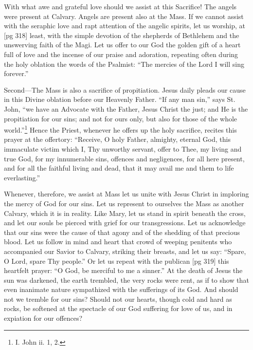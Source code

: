 With what awe and grateful love should we
assist at this Sacrifice! The angels were present
at Calvary. Angels are present also at the Mass.
If we cannot assist with the seraphic love and rapt
attention of the angelic spirits, let us worship, at
[pg 318]
least, with the simple devotion of the shepherds
of Bethlehem and the unswerving faith of the
Magi. Let us offer to our God the golden gift of
a heart full of love and the incense of our praise
and adoration, repeating often during the holy
oblation the words of the Psalmist: “The mercies
of the Lord I will sing forever.”

Second—The Mass is also a sacrifice of propitiation.
Jesus daily pleads our cause in this
Divine oblation before our Heavenly Father. “If
any man sin,” says St. John, “we have an Advocate
with the Father, Jesus Christ the just; and
He is the propitiation for our sins; and not for
ours only, but also for those of the whole world.”\footnote{I.
John ii. 1, 2.}
Hence the Priest, whenever he offers up the holy
sacrifice, recites this prayer at the offertory:
“Receive, O holy Father, almighty, eternal God,
this immaculate victim which I, Thy unworthy
servant, offer to Thee, my living and true God, for
my innumerable sins, offences and negligences, for
all here present, and for all the faithful living and
dead, that it may avail me and them to life everlasting.”

Whenever, therefore, we assist at Mass let us
unite with Jesus Christ in imploring the mercy
of God for our sins. Let us represent to ourselves
the Mass as another Calvary, which it is in
reality. Like Mary, let us stand in spirit beneath
the cross, and let our souls be pierced with grief
for our transgressions. Let us acknowledge that
our sins were the cause of that agony and of the
shedding of that precious blood. Let us follow in
mind and heart that crowd of weeping penitents
who accompanied our Savior to Calvary, striking
their breasts, and let us say: “Spare, O Lord,
spare Thy people.” Or let us repeat with the publican
[pg 319]
this heartfelt prayer: “O God, be merciful
to me a sinner.” At the death of Jesus the sun
was darkened, the earth trembled, the very rocks
were rent, as if to show that even inanimate
nature sympathized with the sufferings of its God.
And should not we tremble for our sins? Should
not our hearts, though cold and hard as rocks, be
softened at the spectacle of our God suffering for
love of us, and in expiation for our offences?


